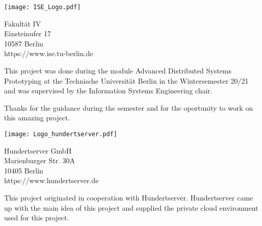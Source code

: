 \thispagestyle{empty}
\vspace*{1.5cm}

\begin{center}
	\texttt{[image: ISE\_Logo.pdf]}
\end{center}

\begin{center}
	Fakultät IV\\
	Einsteinufer 17\\
	10587 Berlin\\
	https://www.ise.tu-berlin.de\\
\end{center}
\vspace*{0.5cm}

\noindent This project was done during the module Advanced Distributed Systems Prototyping at the Technische Universität Berlin in the Wintersemester 20/21 and was supervised by the Information Systems Engineering chair. 

\vspace*{0.5cm}
\noindent Thanks for the guidance during the semester and for the oportunity to work on this amazing project.

\vspace*{1cm}
\noindent 


\begin{center}
\texttt{[image: Logo\_hundertserver.pdf]}
\end{center}

\vspace*{0.2cm}

\begin{center}
Hundertserver GmbH\\
Marienburger Str. 30A\\
10405 Berlin\\
https://www.hundertserver.de\\
\end{center}
\vspace*{0.5cm}

\noindent This project originated in cooperation with Hundertserver. Hundertserver came up with the main idea of this project and supplied the private cloud environment used for this project.









